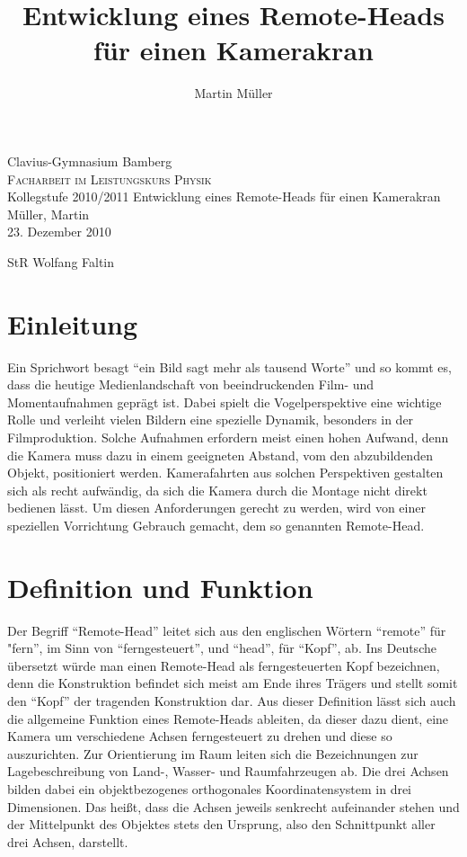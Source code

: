 \documentclass[a4paper, 12pt, bibtotocnumbered, liststotocnumbered]{scrartcl}
\begin{document}
	\title{Entwicklung eines Remote-Heads für einen Kamerakran}
	\author{Martin Müller}

	\thispagestyle{empty}
	\begin{center}
		\large{Clavius-Gymnasium Bamberg}\\
		\Large\textsc{Facharbeit im Leistungskurs Physik}\\
		\large{Kollegstufe 2010/2011}
		\vfill
		{\Huge Entwicklung eines Remote-Heads für einen Kamerakran}
		\vfill
		\hfill{Müller, Martin}\\
		\hfill\small{23. Dezember 2010}\\
	\end{center}
	StR Wolfang Faltin

	\pagebreak

	\thispagestyle{empty}
	\tableofcontents

	\pagebreak

	\section{Einleitung}
	Ein Sprichwort besagt “ein Bild sagt mehr als tausend Worte” und so kommt es, dass die heutige Medienlandschaft von beeindruckenden Film- und Momentaufnahmen geprägt ist. Dabei spielt die Vogelperspektive eine wichtige Rolle und verleiht vielen Bildern eine spezielle Dynamik, besonders in der Filmproduktion. Solche Aufnahmen erfordern meist einen hohen Aufwand, denn die Kamera muss dazu in einem geeigneten Abstand, vom den abzubildenden Objekt, positioniert werden. Kamerafahrten aus solchen Perspektiven gestalten sich als recht aufwändig, da sich die Kamera durch die Montage nicht direkt bedienen lässt. Um diesen Anforderungen gerecht zu werden, wird von einer speziellen Vorrichtung Gebrauch gemacht, dem so genannten Remote-Head.

	\section{Definition und Funktion}
	Der Begriff “Remote-Head” leitet sich aus den englischen Wörtern “remote” für "fern”, im Sinn von “ferngesteuert”, und “head”, für “Kopf”, ab. Ins Deutsche übersetzt würde man einen Remote-Head als ferngesteuerten Kopf bezeichnen, denn die Konstruktion befindet sich meist am Ende ihres Trägers und stellt somit den “Kopf” der tragenden Konstruktion dar.
Aus dieser Definition lässt sich auch die allgemeine Funktion eines Remote-Heads ableiten, da dieser dazu dient, eine Kamera um verschiedene Achsen ferngesteuert zu drehen und diese so auszurichten. Zur Orientierung im Raum leiten sich die Bezeichnungen zur Lagebeschreibung von Land-, Wasser- und Raumfahrzeugen ab. Die drei Achsen bilden dabei ein objektbezogenes orthogonales Koordinatensystem in drei Dimensionen. Das heißt, dass die Achsen jeweils senkrecht aufeinander stehen und der Mittelpunkt des Objektes stets den Ursprung, also den Schnittpunkt aller drei Achsen, darstellt.
\end{document}
